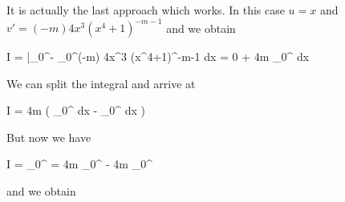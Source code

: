 It is actually the last approach which works. In this case $u=x$ and $v' = (-m) 4x^3 (x^4+1)^{-m-1}$ and we obtain

\bee
I = \bigg|_0^\infty - \int_0^\infty  (-m) 4x^3 (x^4+1)^{-m-1} dx = 0 + 4m \int_0^\infty  {} dx
\eee

We can split the integral and arrive at

\bee
I = 4m \left( \int_0^\infty  {} dx - \int_0^\infty  {} dx \right)
\eee

But now we have

\bee
I = \int_0^\infty {} = 4m \int_0^\infty  {} - 4m \int_0^\infty  {}
\eee

and we obtain

\bee
{}
\eee